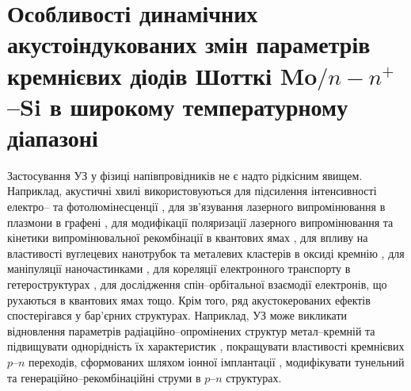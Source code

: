 \chapter{Особливості динамічних акустоіндукованих змін параметрів
кремнієвих діодів Шотткі Mo$/n-n^+$--Si в широкому температурному діапазоні\label{Ch_USL_T_SD}}

Застосування УЗ у фізиці напівпровідників не є надто рідкісним явищем.
Наприклад, акустичні хвилі використовуються для підсилення інтенсивності
електро-- \cite{Wang:JLum} та фотолюмінесценції \cite{Bahar2003,ZobovFTP2008},
для зв'язування лазерного випромінювання в плазмони в графені \cite{Schiefele:2011},
для модифікації поляризації лазерного випромінювання \cite{Kulakova:2012SSC} та
кінетики випромінювальної рекомбінації в квантових ямах \cite{Ostrovskii2001},
для впливу на властивості вуглецевих нанотрубок \cite{Pandey:2014}
та металевих кластерів в оксиді кремнію \cite{Roman:2006JAP,Roman:2007APL},
для маніпуляції наночастинками \cite{Bart:2011},
для кореляції електронного транспорту в гетероструктурах \cite{Buyukkose:2013,He:2010},
для дослідження спін--орбітальної взаємодії електронів, що рухаються в квантових ямах \cite{Sanada:2011} тощо.
Крім того, ряд акустокерованих ефектів спостерігався у бар'єрних структурах.
Наприклад, УЗ може викликати відновлення параметрів радіаційно--опромінених \cite{Gorb2010} структур метал--кремній та підвищувати
однорідність їх характеристик \cite{Olikh:PZTF2006},
покращувати властивості кремнієвих $p$--$n$ переходів, сформованих шляхом іонної імплантації \cite{YOlikh2005},
модифікувати тунельний \cite{Teterkin2009r} та генераційно--рекомбінаційні \cite{Davletova2009,Davletova2008} струми в $p$--$n$ структурах.

